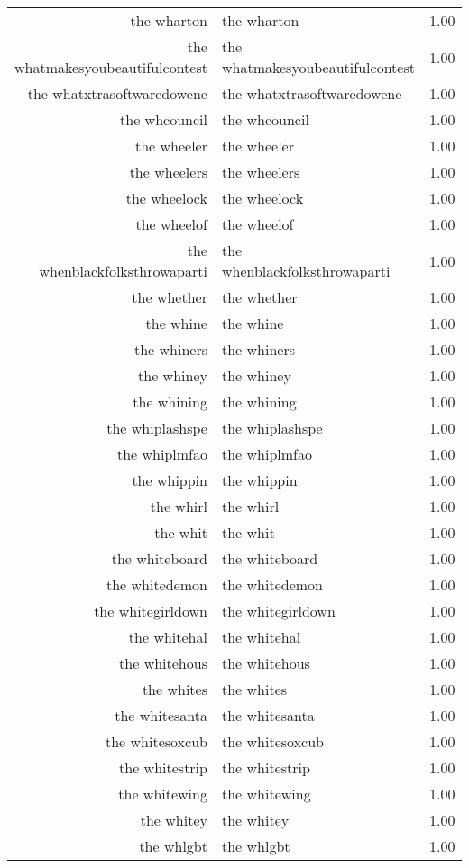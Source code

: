 \begin{table}[ht]
\begin{tabular}{rlr}
  the wharton & the wharton & 1.00 \\ 
  the whatmakesyoubeautifulcontest & the whatmakesyoubeautifulcontest & 1.00 \\ 
  the whatxtrasoftwaredowene & the whatxtrasoftwaredowene & 1.00 \\ 
  the whcouncil & the whcouncil & 1.00 \\ 
  the wheeler & the wheeler & 1.00 \\ 
  the wheelers & the wheelers & 1.00 \\ 
  the wheelock & the wheelock & 1.00 \\ 
  the wheelof & the wheelof & 1.00 \\ 
  the whenblackfolksthrowaparti & the whenblackfolksthrowaparti & 1.00 \\ 
  the whether & the whether & 1.00 \\ 
  the whine & the whine & 1.00 \\ 
  the whiners & the whiners & 1.00 \\ 
  the whiney & the whiney & 1.00 \\ 
  the whining & the whining & 1.00 \\ 
  the whiplashspe & the whiplashspe & 1.00 \\ 
  the whiplmfao & the whiplmfao & 1.00 \\ 
  the whippin & the whippin & 1.00 \\ 
  the whirl & the whirl & 1.00 \\ 
  the whit & the whit & 1.00 \\ 
  the whiteboard & the whiteboard & 1.00 \\ 
  the whitedemon & the whitedemon & 1.00 \\ 
  the whitegirldown & the whitegirldown & 1.00 \\ 
  the whitehal & the whitehal & 1.00 \\ 
  the whitehous & the whitehous & 1.00 \\ 
  the whites & the whites & 1.00 \\ 
  the whitesanta & the whitesanta & 1.00 \\ 
  the whitesoxcub & the whitesoxcub & 1.00 \\ 
  the whitestrip & the whitestrip & 1.00 \\ 
  the whitewing & the whitewing & 1.00 \\ 
  the whitey & the whitey & 1.00 \\ 
  the whlgbt & the whlgbt & 1.00 \\ 

\end{tabular}
\end{table}
